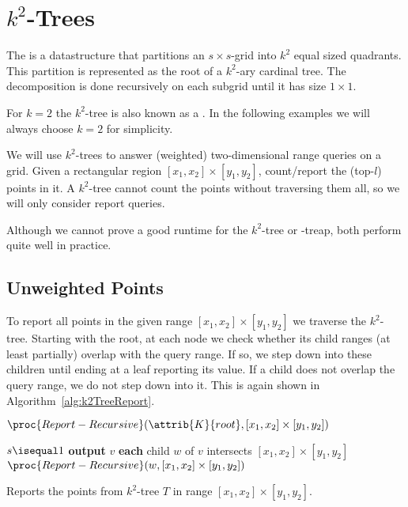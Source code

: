 \section{$k^2$-Trees}

\begin{Definition}
  The  is a datastructure that partitions an $s \times s$-grid into $k^2$ equal sized quadrants. This partition is represented as the root of a $k^2$-ary cardinal tree. The decomposition is done recursively on each subgrid until it has size $1 \times 1$.
\end{Definition}

For $k = 2$ the $k^2$-tree is also known as a . In the following examples we will always choose $k = 2$ for simplicity.

We will use $k^2$-trees to answer (weighted) two-dimensional range queries on a grid. Given a rectangular region $[x_1, x_2] \times [y_1, y_2]$, count/report the (top-$l$) points in it. A $k^2$-tree cannot count the points without traversing them all, so we will only consider report queries.

Although we cannot prove a good runtime for the $k^2$-tree or -treap, both perform quite well in practice.

\subsection{Unweighted Points}
To report all points in the given range $[x_1, x_2] \times [y_1, y_2]$ we traverse the $k^2$-tree. Starting with the root, at each node we check whether its child ranges (at least partially) overlap with the query range. If so, we step down into these children until ending at a leaf reporting its value. If a child does not overlap the query range, we do not step down into it. This is again shown in Algorithm~\ref{alg:k2TreeReport}.

\begin{algorithm}[htb]
  \begin{codebox}
    \li $\proc{Report-Recursive}(\attrib{K}{root}, [x_1, x_2] \times [y_1, y_2])$
  \end{codebox}
  \vspace{1mm}
  \begin{codebox}
    \li \If $s \isequal 1$
        \Then
    \li   \textbf{output} $v$
    \li \Else
    \li   \For \textbf{each} child $w$ of $v$
          \Do
    \li     \If {} intersects $[x_1, x_2] \times [y_1, y_2]$
            \Then
    \li       $\proc{Report-Recursive}(w, [x_1, x_2] \times [y_1, y_2])$
            \End
          \End
        \End
  \end{codebox}
  \caption{Reports the points from $k^2$-tree $T$ in range $[x_1, x_2] \times [y_1, y_2]$.}
  \label{alg:k2TreeReport}
\end{algorithm}


